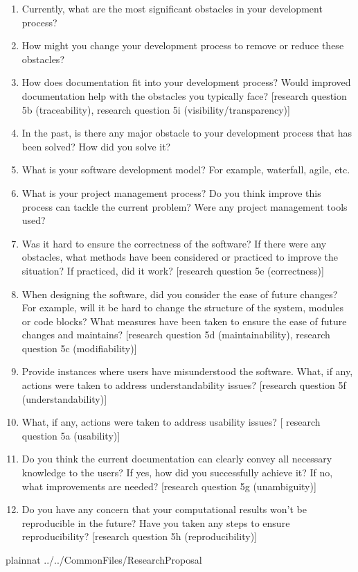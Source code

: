 \documentclass[letterpaper,cleveref]{lipics-v2019}
\begin{document}
\begin{enumerate}
\item Currently, what are the most significant obstacles in your development
process?
\item How might you change your development process to remove or reduce these
obstacles?
\item How does documentation fit into your development process? Would improved
documentation help with the obstacles you typically face? [research question 5b (traceability),
research question 5i (visibility/transparency)]
\item In the past, is there any major obstacle to your development process that
has been solved? How did you solve it?
\item What is your software development model? For example, waterfall, agile,
etc.
\item What is your project management process? Do you think improve this process
can tackle the current problem? Were any project management tools used?
\item Was it hard to ensure the correctness of the software? If there were any
 obstacles, what methods have been considered or practiced to improve the
 situation? If practiced, did it work? [research question 5e (correctness)]
\item When designing the software, did you consider the ease of future changes?
 For example, will it be hard to change the structure of the system, modules or
 code blocks? What measures have been taken to ensure the ease of future changes
 and maintains? [research question 5d (maintainability), 
 research question 5c (modifiability)]
\item Provide instances where users have misunderstood the software. What, if
any, actions were taken to address understandability issues? [research question
5f (understandability)]
\item What, if any, actions were taken to address usability issues? [
research question 5a (usability)]
\item Do you think the current documentation can clearly convey all necessary
knowledge to the users? If yes, how did you successfully achieve it? If no, what
improvements are needed? [research question 5g (unambiguity)]
\item Do you have any concern that your computational results won't be
reproducible in the future? Have you taken any steps to ensure reproducibility?
[research question 5h (reproducibility)]
\end{enumerate}

\newpage

 {plainnat}
 {../../CommonFiles/ResearchProposal}
\end{document}
